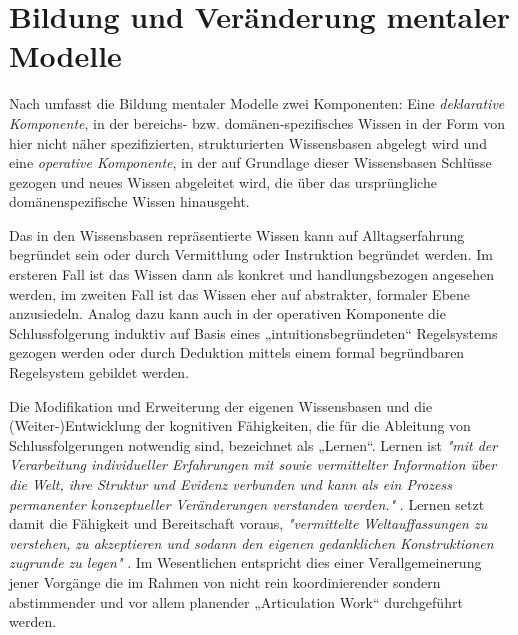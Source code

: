 \section{Bildung und Veränderung mentaler Modelle} %
\label{sec:bildung_mentaler_modelle}

Nach \citep{Seel91} umfasst die Bildung mentaler Modelle zwei Komponenten: Eine \emph{deklarative Komponente}, in der bereichs- bzw. domänen-spezifisches Wissen in der Form von hier nicht näher spezifizierten, strukturierten Wissensbasen abgelegt wird und eine \emph{operative Komponente}, in der auf Grundlage dieser Wissensbasen Schlüsse gezogen und neues Wissen abgeleitet wird, die über das ursprüngliche domänenspezifische Wissen hinausgeht. 

Das in den Wissensbasen repräsentierte Wissen kann auf Alltagserfahrung begründet sein oder durch Vermittlung oder Instruktion begründet werden. Im ersteren Fall ist das Wissen dann als konkret und handlungsbezogen angesehen werden, im zweiten Fall ist das Wissen eher auf abstrakter, formaler Ebene anzusiedeln. Analog dazu kann auch in der operativen Komponente die Schlussfolgerung induktiv auf Basis eines „intuitionsbegründeten“ Regelsystems gezogen werden oder durch Deduktion mittels einem formal begründbaren Regelsystem gebildet werden. 

Die Modifikation und Erweiterung der eigenen Wissensbasen und die (Weiter-)Entwicklung der kognitiven Fähigkeiten, die für die Ableitung von Schlussfolgerungen notwendig sind, bezeichnet \citet{Seel91} als „Lernen“. Lernen ist \emph{"mit der Verarbeitung individueller Erfahrungen mit sowie vermittelter Information über die Welt, ihre Struktur und Evidenz verbunden und kann als ein Prozess permanenter konzeptueller Veränderungen verstanden werden."} \citep[][S. 23]{Seel91}. Lernen setzt damit die Fähigkeit und Bereitschaft voraus, \emph{"vermittelte Weltauffassungen zu verstehen, zu akzeptieren und sodann den eigenen gedanklichen Konstruktionen zugrunde zu legen"} \citep[][S. 23]{Seel91}. Im Wesentlichen entspricht dies einer Verallgemeinerung jener Vorgänge die im Rahmen von nicht rein koordinierender sondern abstimmender und vor allem planender „Articulation Work“ durchgeführt werden.

